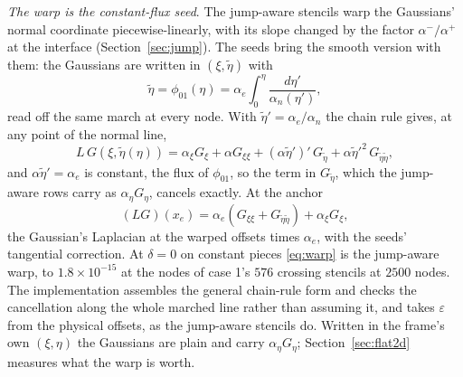 \documentclass[11pt]{amsart}
\theoremstyle{definition}
\theoremstyle{remark}
\newcommand{\para}[1]{\par\smallskip\noindent\textit{#1}.\enspace}
\newcommand{\sci}[2]{#1 \times 10^{#2}}
\begin{document}
\para{The warp is the constant-flux seed}
The jump-aware stencils warp the Gaussians' normal coordinate
piecewise-linearly, with its slope changed by the factor $\alpha^- /
\alpha^+$ at the interface (Section~\ref{sec:jump}). The seeds bring the
smooth version with them: the Gaussians are written in $(\xi, \tilde\eta)$
with
\begin{equation}
  \label{eq:warp}
  \tilde\eta = \phi_{01}(\eta) = \alpha_e \int_0^\eta
  \frac{d\eta'}{\alpha_n(\eta')},
\end{equation}
read off the same march at every node. With $\tilde\eta' = \alpha_e /
\alpha_n$ the chain rule gives, at any point of the normal line,
\begin{equation*}
  L\, G(\xi, \tilde\eta(\eta)) = \alpha_\xi G_\xi + \alpha G_{\xi\xi} +
  (\alpha \tilde\eta')'\, G_{\tilde\eta} + \alpha \tilde\eta'^2\,
  G_{\tilde\eta\tilde\eta},
\end{equation*}
and $\alpha \tilde\eta' = \alpha_e$ is constant, the flux of $\phi_{01}$, so
the term in $G_{\tilde\eta}$, which the jump-aware rows carry as
$\alpha_\eta G_\eta$, cancels exactly. At the anchor
\begin{equation}
  \label{eq:gaussrhs}
  (L G)(x_e) = \alpha_e (G_{\xi\xi} + G_{\tilde\eta\tilde\eta}) +
  \alpha_\xi G_\xi ,
\end{equation}
the Gaussian's Laplacian at the warped offsets times $\alpha_e$, with the
seeds' tangential correction. At $\delta = 0$ on constant pieces
\eqref{eq:warp} is the jump-aware warp, to $\sci{1.8}{-15}$ at the nodes of
case 1's $576$ crossing stencils at $2500$ nodes. The implementation
assembles the general chain-rule form and checks the cancellation along the
whole marched line rather than assuming it, and takes $\varepsilon$ from
the physical offsets, as the jump-aware stencils do. Written in the frame's
own $(\xi, \eta)$ the Gaussians are plain and carry $\alpha_\eta G_\eta$;
Section~\ref{sec:flat2d} measures what the warp is worth.
\end{document}
